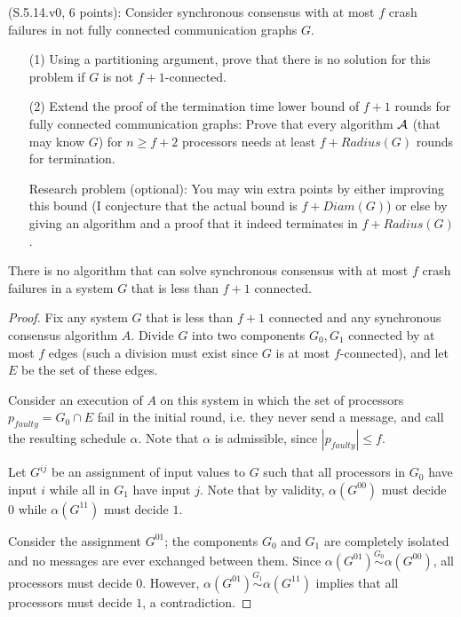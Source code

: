 
\begin{Exc}{(S.5.14.v0, 6 points):}
Consider synchronous consensus with at most $f$ crash failures in not
fully connected communication graphs $G$.
\begin{enumerate}
\item[(1)] Using a partitioning argument, prove that there is no solution for this problem if $G$
is not $f+1$-connected.
\item[(2)] Extend the proof of the termination time lower bound of $f+1$ rounds
for fully connected communication graphs: Prove that every algorithm ${\cal A}$
(that may know $G$) for $n\geq f+2$ processors needs at least $f+Radius(G)$ rounds
for termination.

Research problem (optional): You may win extra points by either improving this
bound (I conjecture that the actual bound is $f+Diam(G)$) or else
by giving an algorithm and a proof that it indeed terminates in
$f+Radius(G)$.
\end{enumerate}
\end{Exc}

\begin{theorem}
There is no algorithm that can solve synchronous consensus with at most $f$
crash failures in a system $G$ that is less than $f+1$ connected.
\end{theorem}

\begin{proof}
Fix any system $G$ that is less than $f+1$ connected and any synchronous consensus
algorithm $A$. Divide $G$ into two components $G_0, G_1$ connected by at most $f$
edges (such a division must exist since $G$ is at most $f$-connected), and let
$E$ be the set of these edges.

Consider an execution of $A$ on this system in which the set of processors
$p_{faulty} = G_0 \cap E$ fail in the initial round, i.e. they never send
a message, and call the resulting schedule $\alpha$.
Note that $\alpha$ is admissible, since $|p_{faulty}| \leq f$.

Let $G^{ij}$ be an assignment of input values to $G$ such that all processors in $G_0$
have input $i$ while all in $G_1$ have input $j$.
Note that by validity, $\alpha(G^{00})$ must decide $0$ while $\alpha(G^{11})$ must decide $1$.

Consider the assignment $G^{01}$;
the components $G_0$ and $G_1$ are completely isolated and no messages are ever exchanged between
them. Since $\alpha(G^{01}) \stackrel{G_0}{\sim} \alpha(G^{00})$, all processors must decide
$0$. However, $\alpha(G^{01}) \stackrel{G_1}{\sim} \alpha(G^{11})$ implies that all processors
must decide $1$, a contradiction.
\end{proof}

